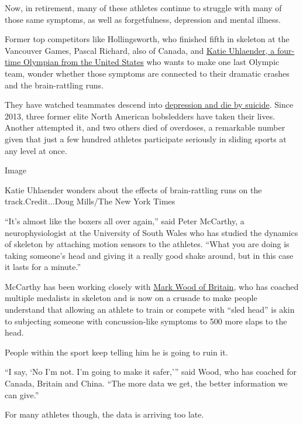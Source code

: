 Now, in retirement, many of these athletes continue to struggle with
many of those same symptoms, as well as forgetfulness, depression and
mental illness.

Former top competitors like Hollingsworth, who finished fifth in
skeleton at the Vancouver Games, Pascal Richard, also of Canada, and
\href{https://www.nytimes.com/2020/06/06/sports/olympics/coronavirus-olympic-training-tokyo.html}{Katie
Uhlaender, a four-time Olympian from the United States} who wants to
make one last Olympic team, wonder whether those symptoms are connected
to their dramatic crashes and the brain-rattling runs.

They have watched teammates descend into
\href{https://www.teamusa.org/News/2020/May/09/Pavle-Jovanovic-2006-Olympic-Bobsledder-Dies-By-Suicide}{depression
and die by suicide}. Since 2013, three former elite North American
bobsledders have taken their lives. Another attempted it, and two others
died of overdoses, a remarkable number given that just a few hundred
athletes participate seriously in sliding sports at any level at once.

Image

Katie Uhlaender wonders about the effects of brain-rattling runs on the
track.Credit...Doug Mills/The New York Times

``It's almost like the boxers all over again,'' said Peter McCarthy, a
neurophysiologist at the University of South Wales who has studied the
dynamics of skeleton by attaching motion sensors to the athletes. ``What
you are doing is taking someone's head and giving it a really good shake
around, but in this case it lasts for a minute.''

McCarthy has been working closely with
\href{https://www.ibsf.org/en/news/9-skeleton/20677-head-coach-talent-mark-wood-leaves-british-bobsleigh-skeleton-association}{Mark
Wood of Britain}, who has coached multiple medalists in skeleton and is
now on a crusade to make people understand that allowing an athlete to
train or compete with ``sled head'' is akin to subjecting someone with
concussion-like symptoms to 500 more slaps to the head.

People within the sport keep telling him he is going to ruin it.

``I say, `No I'm not. I'm going to make it safer,''' said Wood, who has
coached for Canada, Britain and China. ``The more data we get, the
better information we can give.''

For many athletes though, the data is arriving too late.

